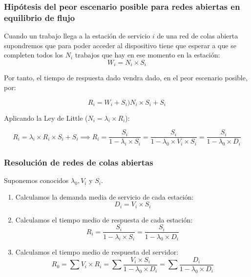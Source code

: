 \documentclass[12pt,spanish]{article}
\begin{document}
\subsubsection{Hipótesis del peor escenario posible para redes abiertas en equilibrio de flujo}

Cuando un trabajo llega a la estación de servicio $i$ de una red de colas abierta supondremos que para poder acceder al dispositivo tiene que esperar a que se completen todos los $N_i$ trabajos que hay en ese momento en la estación:
\begin{equation*}
	W_i=N_i \times S_i
\end{equation*}

Por tanto, el tiempo de respuesta dado vendra dado, en el peor escenario posible, por:

\begin{equation*}
	R_i = W_i + S_i ) N_i \times S_i + S_i
\end{equation*}

Aplicando la Ley de Little ($N_i=\lambda_i \times R_i$):

\begin{equation*}
	R_i = \lambda_i \times R_i \times S_i + S_i \implies R_i = \frac{S_i}{1 - \lambda_i \times S_i}=\frac{S_i}{1 - \lambda_0 \times V_i \times S_i}=\frac{S_i}{1-\lambda_0 \times D_i}
\end{equation*}

\subsubsection{Resolución de redes de colas abiertas}

Suponemos conocidos $\lambda_0, V_i$ y $S_i$.

\begin{enumerate}
	\item Calculamos la demanda media de servicio de cada estación:
		\begin{equation*}
			D_i=V_i \times S_i
		\end{equation*}
	\item Calculamos el tiempo medio de respuesta de cada estación:
		\begin{equation*}
			R_i=\frac{S_i}{1 - \lambda_i \times S_i}=\frac{S_i}{1 - \lambda_0 \times D_i}
		\end{equation*}
	\item Calculamos el tiempo medio de respuesta del servidor:
		\begin{equation*}
			R_0=\sum{V_i \times R_i}=\sum{\frac{V_i \times S_i}{1 - \lambda_0 \times D_i} = \sum{\frac{D_i}{1 - \lambda_0 \times D_i}}}
		\end{equation*}
\end{enumerate}
\end{document}
